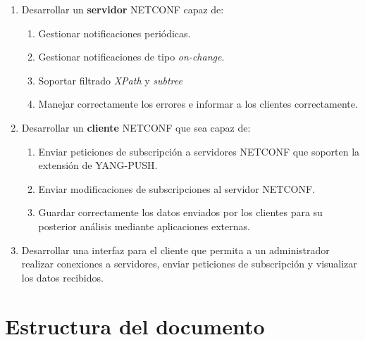 \begin{enumerate}[label=\textbf{O\arabic*} - , leftmargin=3\parindent]

    \item Desarrollar un \textbf{servidor} NETCONF capaz de:
        \begin{enumerate}[label=\textbf{O1.\arabic*} - , leftmargin=1\parindent]
            \item Gestionar notificaciones periódicas.
            \item Gestionar notificaciones de tipo \textit{on-change}.
            \item Soportar filtrado \textit{XPath} y \textit{subtree}
            \item Manejar correctamente los errores e informar a los clientes correctamente.
        \end{enumerate}    
    
    \item Desarrollar un \textbf{cliente} NETCONF que sea capaz de:
        \begin{enumerate}[label=\textbf{O2.\arabic*} - , leftmargin=1\parindent]
            \item Enviar peticiones de subscripción a servidores NETCONF que soporten la extensión de YANG-PUSH.
            \item Enviar modificaciones de subscripciones al servidor NETCONF.
            \item Guardar correctamente los datos enviados por los clientes para su posterior análisis mediante aplicaciones externas.
        \end{enumerate}    
    \item Desarrollar una interfaz para el cliente que permita a un administrador realizar conexiones a servidores, enviar peticiones de subscripción y visualizar los datos recibidos.
\end{enumerate}


\section{Estructura del documento}

